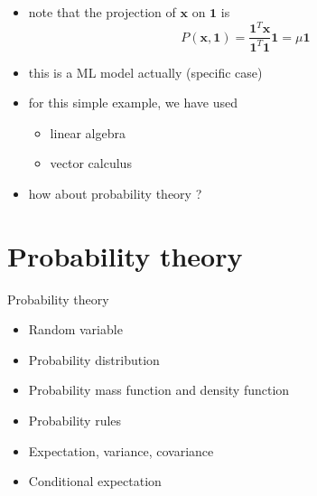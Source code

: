 \documentclass[ignorenonframetext,]{beamer}
\providecommand{\tightlist}{%
  \setlength{\itemsep}{0pt}\setlength{\parskip}{0pt}}
\newcommand{\vv}[1]{\boldsymbol{#1}}
\begin{document}
\begin{frame}{}
\protect\hypertarget{section-8}{}

\begin{itemize}
\item
  note that the projection of \(\vv{x}\) on \(\vv{1}\) is
  \[P(\vv{x}, \vv{1}) = \frac{\vv{1}^T\vv{x}}{\vv{1}^T\vv{1}} \vv{1} = \mu \vv{1}\]
\item
  this is a ML model actually (specific case)
\item
  for this simple example, we have used

  \begin{itemize}
  \tightlist
  \item
    linear algebra
  \item
    vector calculus
  \end{itemize}
\item
  how about probability theory ?
\end{itemize}

\end{frame}

\hypertarget{probability-theory}{%
\section{Probability theory}\label{probability-theory}}

\begin{frame}{Probability theory}
\protect\hypertarget{probability-theory-1}{}

\begin{itemize}
\tightlist
\item
  Random variable \bigskip
\item
  Probability distribution \bigskip
\item
  Probability mass function and density function \bigskip
\item
  Probability rules \bigskip
\item
  Expectation, variance, covariance \bigskip
\item
  Conditional expectation
\end{itemize}

\end{frame}
\end{document}

